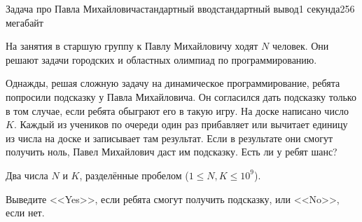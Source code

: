 \begin{problem}{Задача про Павла Михайловича}{стандартный ввод}{стандартный вывод}{1 секунда}{256 мегабайт}

На занятия в старшую группу к Павлу Михайловичу ходят $N$ человек. Они решают задачи городских и областных олимпиад по программированию.

Однажды, решая сложную задачу на динамическое программирование, ребята попросили подсказку у Павла Михайловича. Он согласился дать подсказку только в том случае, если ребята обыграют его в такую игру. На доске написано число $K$. Каждый из учеников по очереди один раз прибавляет или вычитает единицу из числа на доске и записывает там результат. Если в результате они смогут получить ноль, Павел Михайлович даст им подсказку. Есть ли у ребят шанс?

\InputFile
Два числа $N$ и $K$, разделённые пробелом ($1 \le N, K \le 10^9$).

\OutputFile
Выведите <<Yes>>, если ребята смогут получить подсказку, или <<No>>, если нет.

\Example

\begin{example}
%
\end{example}

\end{problem}

